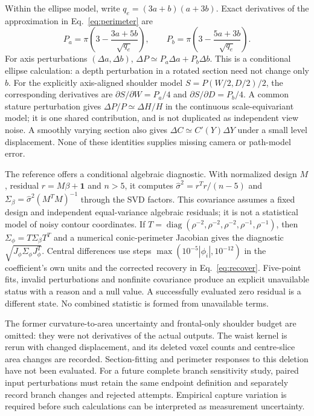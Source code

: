 \documentclass[11pt,a4paper]{article}
\begin{document}
Within the ellipse model, write $q_e=(3a+b)(a+3b)$. Exact derivatives of the approximation in Eq.~\eqref{eq:perimeter} are
\begin{equation}
 P_a=\pi\left(3-\frac{3a+5b}{\sqrt{q_e}}\right),\qquad
 P_b=\pi\left(3-\frac{5a+3b}{\sqrt{q_e}}\right).
 \label{eq:derivative}
\end{equation}
For axis perturbations $(\Delta a,\Delta b)$, $\Delta P\simeq P_a\Delta a+P_b\Delta b$. This is a conditional ellipse calculation: a depth perturbation in a rotated section need not change only $b$. For the explicitly axis-aligned shoulder model $S=P(W/2,D/2)/2$, the corresponding derivatives are $\partial S/\partial W=P_a/4$ and $\partial S/\partial D=P_b/4$. A common stature perturbation gives $\Delta P/P\simeq\Delta H/H$ in the continuous scale-equivariant model; it is one shared contribution, and is not duplicated as independent view noise. A smoothly varying section also gives $\Delta C\simeq C'(Y)\Delta Y$ under a small level displacement. None of these identities supplies missing camera or path-model error.

The reference offers a conditional algebraic diagnostic. With normalized design $M$, residual $r=M\beta+\mathbf1$ and $n>5$, it computes $\hat\sigma^2=r^Tr/(n-5)$ and $\Sigma_\beta=\hat\sigma^2(M^TM)^{-1}$ through the SVD factors. This covariance assumes a fixed design and independent equal-variance algebraic residuals; it is not a statistical model of noisy contour coordinates. If $T=\operatorname{diag}(\rho^{-2},\rho^{-2},\rho^{-2},\rho^{-1},\rho^{-1})$, then $\Sigma_\phi=T\Sigma_\beta T^T$ and a numerical conic-perimeter Jacobian gives the diagnostic $\sqrt{J_\phi\Sigma_\phi J_\phi^T}$. Central differences use steps $\max(10^{-5}|\phi_i|,10^{-12})$ in the coefficient's own units and the corrected recovery in Eq.~\eqref{eq:recover}. Five-point fits, invalid perturbations and nonfinite covariance produce an explicit unavailable status with a reason and a null value. A successfully evaluated zero residual is a different state. No combined statistic is formed from unavailable terms.

The former curvature-to-area uncertainty and frontal-only shoulder budget are omitted: they were not derivatives of the actual outputs. The waist kernel is rerun with changed displacement, and its deleted voxel counts and centre-slice area changes are recorded. Section-fitting and perimeter responses to this deletion have not been evaluated. For a future complete branch sensitivity study, paired input perturbations must retain the same endpoint definition and separately record branch changes and rejected attempts. Empirical capture variation is required before such calculations can be interpreted as measurement uncertainty.
\end{document}
